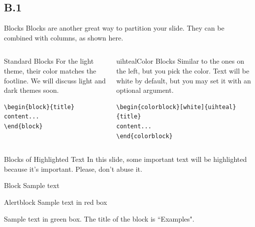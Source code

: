 \documentclass[]{beamer}
\begin{document}
\subsection{B.1}
\begin{frame}[fragile]{Blocks}
Blocks are another great way to partition your slide. They can be combined with columns, as shown here.
\begin{columns}
\begin{column}{0.3\textwidth}
\begin{block}{Standard Blocks}
For the light theme, their color matches the footline. We will discuss light and dark themes soon.
\begin{verbatim}
\begin{block}{title}
content...
\end{block}
\end{verbatim}
\end{block}
\end{column}
\begin{column}{0.7\textwidth}
\begin{colorblock}[white]{uihteal}{Color Blocks}
Similar to the ones on the left, but you pick the color. Text will be white by 
default, but you may set it with an optional argument.
\small
\begin{verbatim}
\begin{colorblock}[white]{uihteal}{title}
content...
\end{colorblock}
\end{verbatim}
\end{colorblock}
\end{column}
\end{columns}
\end{frame}


\begin{frame}{Blocks of Highlighted Text}
    In this slide, some important text will be \alert{highlighted} because it's important. Please, don't abuse it.

    \begin{block}{Block}
        Sample text
    \end{block}

    \begin{alertblock}{Alertblock}
        Sample text in red box
    \end{alertblock}

    \begin{examples}
        Sample text in green box. The title of the block is ``Examples".
    \end{examples}
\end{frame}
\end{document}

